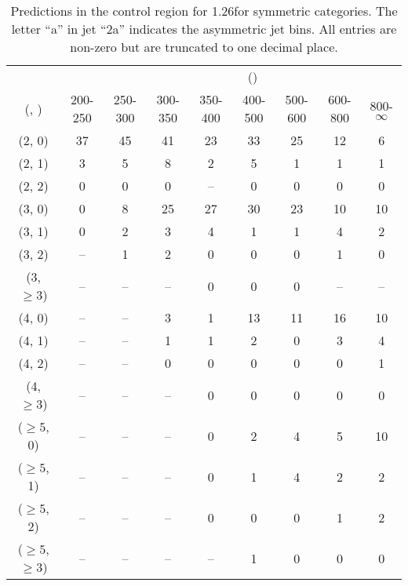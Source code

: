 \begin{table}[h!]
\tiny
\centering
\caption{Predictions in the \mmj control region for 1.26\ifb for symmetric categories. The letter ``a'' in jet \eg ``2a''  indicates the asymmetric jet bins. All entries are non-zero but are truncated to one decimal place.\label{tab:predsep_mumu_data_sym}}
\begin{tabular}
{ccccccccc}
	\hline\hline
&	& \multicolumn{8}{c}{\scalht (\gev)} \\ 
	 (\njet,  \nb) & 200-250 & 250-300 & 300-350 & 350-400 & 400-500 & 500-600 & 600-800 & 800-$\infty$ \\ [0.8ex] 
\hline
	(2, 0) & 37 & 45 & 41 & 23 & 33 & 25 & 12 & 6 \\[0.5ex] 
	(2, 1) & 3 & 5 & 8 & 2 & 5 & 1 & 1 & 1 \\[0.5ex] 
	(2, 2) & 0 & 0 & 0 & -- & 0 & 0 & 0 & 0 \\[0.5ex] 
	(3, 0) & 0 & 8 & 25 & 27 & 30 & 23 & 10 & 10 \\[0.5ex] 
	(3, 1) & 0 & 2 & 3 & 4 & 1 & 1 & 4 & 2 \\[0.5ex] 
	(3, 2) & -- & 1 & 2 & 0 & 0 & 0 & 1 & 0 \\[0.5ex] 
	(3, $\ge3$) & -- & -- & -- & 0 & 0 & 0 & -- & -- \\[0.5ex] 
	(4, 0) & -- & -- & 3 & 1 & 13 & 11 & 16 & 10 \\[0.5ex] 
	(4, 1) & -- & -- & 1 & 1 & 2 & 0 & 3 & 4 \\[0.5ex] 
	(4, 2) & -- & -- & 0 & 0 & 0 & 0 & 0 & 1 \\[0.5ex] 
	(4, $\ge3$) & -- & -- & -- & 0 & 0 & 0 & 0 & 0 \\[0.5ex] 
	($\ge5$, 0) & -- & -- & -- & 0 & 2 & 4 & 5 & 10 \\[0.5ex] 
	($\ge5$, 1) & -- & -- & -- & 0 & 1 & 4 & 2 & 2 \\[0.5ex] 
	($\ge5$, 2) & -- & -- & -- & 0 & 0 & 0 & 1 & 2 \\[0.5ex] 
	($\ge5$, $\ge3$) & -- & -- & -- & -- & 1 & 0 & 0 & 0 \\[0.5ex] 
	\hline
	\hline
\end{tabular}
\end{table}
